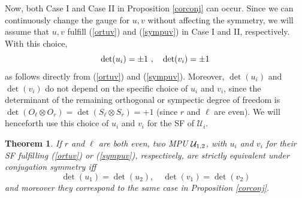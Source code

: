 \documentclass[pra,twocolumn,nofootinbib,superscriptaddress]{revtex4-1}
\newcommand{\be}{\begin{equation}}
\newcommand{\ee}{\end{equation}}
\newtheorem{thm}{Theorem}[section]
\begin{document}
Now, both Case I and Case II in Proposition \ref{corconj} can occur. Since
we can continuously change the gauge for $u,v$ without affecting the
symmetry, we will assume that $u,v$ fulfill (\ref{ortuv}) and
(\ref{sympuv}) in Case I and II, respectively. With this choice,
\be
{\rm det}(u_i)=\pm1\ ,\quad {\rm det}(v_i)=\pm1 \,
\ee
as follows directly from (\ref{ortuv}) and (\ref{sympuv}). Moreover,
$\det(u_i)$ and $\det(v_i)$ do not depend on the specific choice of $u_i$
and $v_i$, since the determinant of the remaining orthogonal or sympectic
degree of freedom is $\det(O_\ell\otimes O_r)=\det(S_\ell\otimes S_r)=+1$
(since $r$ and $\ell$ are even).  We will henceforth use this choice of
$u_i$ and $v_i$ for the SF of $\mathcal U_i$.



\begin{thm}
	\label{prop:conjsym-strict-equiv}
	If $r$ and $\ell$ are both even, two MPU
	${\cal U}_{1,2}$, with $u_i$ and $v_i$ for their SF fulfilling
	(\ref{ortuv}) or (\ref{sympuv}), respectively,
	are strictly equivalent under conjugation symmetry iff
	\[
		\det(u_1)=\det(u_2), \quad \det(v_1)=\det(v_2)
	\]
	and moreover they correspond to the same case in Proposition
	\ref{corconj}.
\end{thm}
\end{document}
